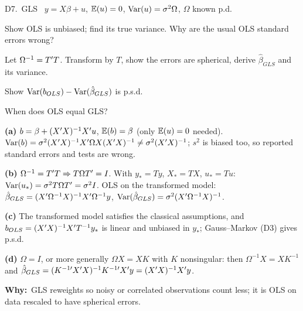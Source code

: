 \documentclass[11pt]{article}
\newcommand{\tagbox}[2]{\tcbox[on line, colback=#1, colframe=#1, coltext=white,
  boxsep=1pt, left=3pt, right=3pt, top=0pt, bottom=0pt, arc=1.5pt]{\scriptsize\sffamily\bfseries #2}}
\newcommand{\likely}{\tagbox{likelyor}{$\star\star$ LIKELY}}
\newcommand{\newtag}{\tagbox{qnavy!60}{NEW}}
\newcommand{\step}[1]{\par\smallskip\noindent\textbf{\textcolor{qnavy}{#1}}\quad\ignorespaces}
\newcommand{\Why}{\textbf{\textcolor{whyline}{Why:}}\ }
\begin{document}
\begin{qbox}{D7.\ GLS}{\likely\ \newtag}
$y=X\beta+u$, $\mathbb{E}(u)=0$, $\operatorname{Var}(u)=\sigma^{2}\Omega$, $\Omega$ known p.d.
\begin{flatlist}
  \item[(a)] Show OLS is unbiased; find its true variance. Why are the usual OLS standard errors wrong?
  \item[(b)] Let $\Omega^{-1}=T^{\prime} T$. Transform by $T$, show the errors are spherical, derive $\hat\beta_{GLS}$ and its variance.
  \item[(c)] Show $\operatorname{Var}(b_{OLS})-\operatorname{Var}(\hat\beta_{GLS})$ is p.s.d.
  \item[(d)] When does OLS equal GLS?
\end{flatlist}
\end{qbox}
\begin{solbox}
\step{(a)} $b=\beta+(X^{\prime} X)^{-1}X^{\prime} u$, $\mathbb{E}(b)=\beta$ (only $\mathbb{E}(u)=0$ needed). $\operatorname{Var}(b)=\sigma^{2}(X^{\prime} X)^{-1}X^{\prime}\Omega X(X^{\prime} X)^{-1}\ne\sigma^{2}(X^{\prime} X)^{-1}$; $s^{2}$ is biased too,
so reported standard errors and tests are wrong.
\step{(b)} $\Omega^{-1}=T^{\prime} T\Rightarrow T\Omega T^{\prime}=I$. With $y_{*}=Ty$, $X_{*}=TX$, $u_{*}=Tu$: $\operatorname{Var}(u_{*})=\sigma^{2}T\Omega T^{\prime}=\sigma^{2}I$. OLS on the transformed model:
$\hat\beta_{GLS}=(X^{\prime}\Omega^{-1}X)^{-1}X^{\prime}\Omega^{-1}y$, $\operatorname{Var}(\hat\beta_{GLS})=\sigma^{2}(X^{\prime}\Omega^{-1}X)^{-1}$.
\step{(c)} The transformed model satisfies the classical assumptions, and $b_{OLS}=(X^{\prime} X)^{-1}X^{\prime} T^{-1}y_{*}$ is linear and unbiased in $y_{*}$; Gauss--Markov (D3) gives p.s.d.
\step{(d)} $\Omega=I$, or more generally $\Omega X=XK$ with $K$ nonsingular: then $\Omega^{-1}X=XK^{-1}$ and
$\hat\beta_{GLS}=(K^{-1\prime}X^{\prime} X)^{-1}K^{-1\prime}X^{\prime} y=(X^{\prime} X)^{-1}X^{\prime} y$.
\begin{why}\Why GLS reweights so noisy or correlated observations count less; it is OLS on data rescaled to have spherical errors.\end{why}
\end{solbox}
\end{document}
